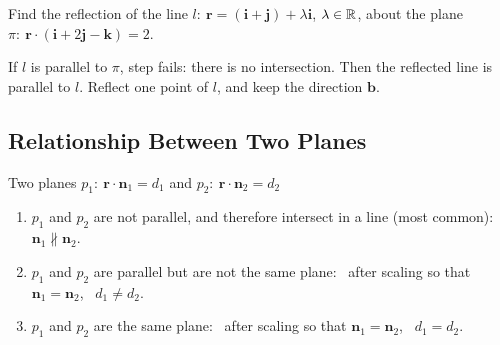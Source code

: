 \begin{example}[label=ex:5.11]
Find the reflection of the line $l:\ \mathbf{r} = (\mathbf{i}+\mathbf{j}) + \lambda\mathbf{i}$, $\lambda\in\mathbb{R}$, about the plane $\pi:\ \mathbf{r}\cdot(\mathbf{i}+2\mathbf{j}-\mathbf{k}) = 2$.
\end{example}

\begin{caution}
If $l$ is parallel to $\pi$, step  fails: there is no intersection. Then the reflected line is parallel to $l$. Reflect one point of $l$, and keep the direction $\mathbf{b}$.
\end{caution}

\clearpage
\subsection{Relationship Between Two Planes}
\begin{definition}{{Two planes $p_1:\ \mathbf{r}\cdot\mathbf{n}_1 = d_1$ and $p_2:\ \mathbf{r}\cdot\mathbf{n}_2 = d_2$}}
\begin{enumerate}
  \item $p_1$ and $p_2$ are not parallel, and therefore intersect in a line (most common): \ $\mathbf{n}_1\not\parallel\mathbf{n}_2$.
  \item $p_1$ and $p_2$ are parallel but are not the same plane: \ after scaling so that $\mathbf{n}_1 = \mathbf{n}_2$, \ $d_1\neq d_2$.
  \item $p_1$ and $p_2$ are the same plane: \ after scaling so that $\mathbf{n}_1 = \mathbf{n}_2$, \ $d_1 = d_2$.
\end{enumerate}
\end{definition}

